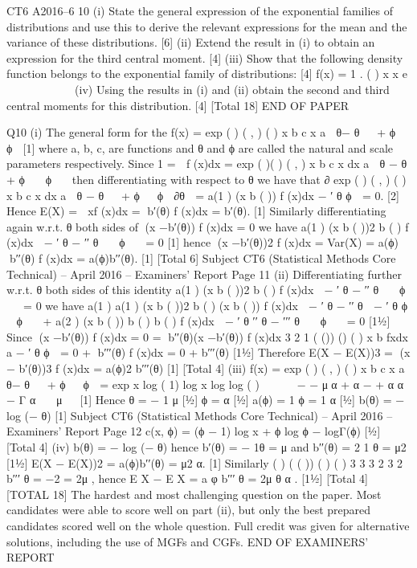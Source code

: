 CT6 A2016–6
10 (i) State the general expression of the exponential families of distributions and
use this to derive the relevant expressions for the mean and the variance of
these distributions. [6]
(ii) Extend the result in (i) to obtain an expression for the third central moment.
[4]
(iii) Show that the following density function belongs to the exponential family
of distributions: [4]
f(x) = 1 .
( )
x x e

  


  
(iv) Using the results in (i) and (ii) obtain the second and third central moments
for this distribution. [4]
[Total 18]
END OF PAPER

Q10 (i) The general form for the
f(x) =
  exp ( ) ( , )
( )
x b c x
a
 θ− θ   + ϕ   ϕ 
[1]
where a, b, c, are functions and θ and ϕ are called the natural and scale
parameters respectively.
Since
1 =  f (x)dx = exp ( )( ) ( , )
x b c x dx a
 θ − θ + ϕ   ϕ  
then differentiating with respect to θ we have that
∂
exp ( ) ( , )
( )
x b c x dx
a
 θ − θ   + ϕ   ϕ 
∂θ

= a(1 ) (x b ( )) f (x)dx
− ′ θ ϕ  = 0. [2]
Hence E(X) =  xf (x)dx = b′(θ) f (x)dx = b′(θ). [1]
Similarly differentiating again w.r.t. θ both sides of (x −b′(θ)) f (x)dx = 0 we
have
a(1 ) (x b ( ))2 b ( ) f (x)dx
 − ′ θ − ′′ θ   ϕ   = 0 [1]
hence
(x −b′(θ))2 f (x)dx = Var(X) = a(ϕ) b′′(θ) f (x)dx = a(ϕ)b′′(θ). [1]
[Total 6]
Subject CT6 (Statistical Methods Core Technical) – April 2016 – Examiners’ Report
Page 11
(ii) Differentiating further w.r.t. θ both sides of this identity
a(1 ) (x b ( ))2 b ( ) f (x)dx
 − ′ θ − ′′ θ   ϕ   = 0
we have
a(1 ) a(1 ) (x b ( ))2 b ( ) (x b ( )) f (x)dx
 − ′ θ − ′′ θ  − ′ θ ϕ  ϕ  
+ a(2 ) (x b ( )) b ( ) b ( ) f (x)dx
 − ′ θ ′′ θ − ′′′ θ   ϕ   = 0 [1½]
Since
(x −b′(θ)) f (x)dx = 0 = b′′(θ)(x −b′(θ)) f (x)dx
3
2
1 ( ()) ()
( )
x b fxdx
a
− ′ θ
ϕ  = 0 + b′′′(θ) f (x)dx
= 0 + b′′′(θ) [1½]
Therefore
E(X − E(X))3 = (x − b′(θ))3 f (x)dx = a(ϕ)2 b′′′(θ) [1]
[Total 4]
(iii) f(x) =
  exp ( ) ( , )
( )
x b c x
a
 θ− θ   + ϕ   ϕ 
= exp x log ( 1) log x log log ( )
  
 − − μα + α − + α α − Γ α   μ  
[1]
Hence
θ =
  − 1
μ
[½]
ϕ = α [½]
a(ϕ) =
  1
ϕ
= 1
α
[½]
b(θ) = − log (− θ) [1]
Subject CT6 (Statistical Methods Core Technical) – April 2016 – Examiners’ Report
Page 12
c(x, ϕ) = (ϕ − 1) log x + ϕ log ϕ − logΓ(ϕ) [½]
[Total 4]
(iv) b(θ) = − log (− θ) hence b′(θ) = − 1θ = μ and b′′(θ) = 2
1
θ
= μ2 [1½]
E(X − E(X))2 = a(ϕ)b′′(θ) =
  μ2
α. [1]
Similarly ( ) ( ( )) ( ) ( )
3 3 3 2
3 2
b′′′ θ = −2 = 2μ , hence E X − E X = a φ b′′′ θ = 2μ
θ α
. [1½]
[Total 4]
[TOTAL 18]
The hardest and most challenging question on the paper. Most candidates
were able to score well on part (ii), but only the best prepared candidates
scored well on the whole question. Full credit was given for alternative
solutions, including the use of MGFs and CGFs.
END OF EXAMINERS’ REPORT
